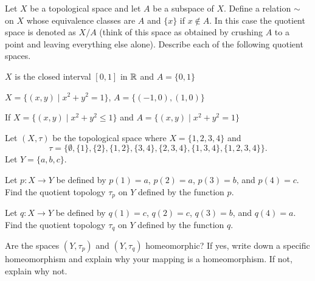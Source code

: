 \item Let $X$ be a topological space and let $A$ be a subspace of $X$. Define a relation $\sim$ on $X$ whose equivalence classes are $A$ and $\{x\}$ if $x \notin A$. In this case the quotient space is denoted as $X/A$ (think of this space as obtained by crushing $A$ to a point and leaving everything else alone). Describe each of the following quotient spaces.
\ba

\item  $X$ is the closed interval $[0,1]$ in $\mathbb{R}$ and $A = \{0,1\}$

\item $X = \{(x,y) \mid x^2+y^2 = 1\}$, $A = \{(-1,0), (1,0)\}$

\item If $X= \{(x,y) \mid x^2+y^2 \leq 1\}$ and $A = \{(x,y) \mid x^2+y^2 = 1\}$

\ea


\begin{comment}

\ExerciseSolution

\ba

\item This space identifies the endpoints of the unit interval and we have seen that this quotient space is a circle.

\item Take a circle and smash two antipodal points together and we get a figure eight.

\item If we identify all of the points on the boundary of a disk we end up with the surface of a sphere. 

\ea

\end{comment}

\item Let $(X, \tau)$ be the topological space where $X = \{1, 2, 3, 4\}$ and 
\[\tau = \{\emptyset, \{1\}, \{2\}, \{1, 2\}, \{3, 4\}, \{2, 3, 4\}, \{1, 3, 4\}, \{1, 2, 3, 4\}\}.\]
Let $Y = \{a, b, c\}$.
\ba
\item Let $p: X \to Y$ be defined by $p(1)=a$, $p(2) = a$, $p(3)=b$, and $p(4) = c$. Find the quotient topology $\tau_p$ on $Y$ defined by the function $p$.

\item Let $q : X \to Y$ be defined by $q(1)=c$, $q(2) = c$, $q(3) = b$, and $q(4) = a$. Find the quotient topology $\tau_q$ on $Y$ defined by the function $q$.

\item Are the spaces $(Y, \tau_p)$ and $(Y, \tau_q)$ homeomorphic? If yes, write down a specific homeomorphism and explain why your mapping is a homeomorphism. If not, explain why not.

